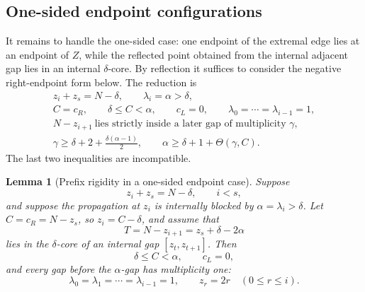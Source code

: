 \documentclass[11pt]{article}
\newtheorem{lemma}[theorem]{Lemma}
\begin{document}
\subsection{One-sided endpoint configurations}

It remains to handle the one-sided case: one endpoint of the extremal edge lies at an endpoint of $Z$, while the reflected point obtained from the internal adjacent gap lies in an internal $\delta$-core.  By reflection it suffices to consider the negative right-endpoint form below.  The reduction is
\[
\begin{gathered}
        z_i+z_s=N-\delta,
        \qquad
        \lambda_i=\alpha>\delta,\\
        C=c_R,
        \qquad
        \delta\le C<\alpha,
        \qquad
        c_L=0,
        \qquad
        \lambda_0=\cdots=\lambda_{i-1}=1,\\
        N-z_{i+1}\ \text{lies strictly inside a later gap of multiplicity }\gamma,\\
        \gamma\ge \delta+2+\frac{\delta(\alpha-1)}2,
        \qquad
        \alpha\ge \delta+1+\Theta(\gamma,C).
\end{gathered}
\]
The last two inequalities are incompatible.


\begin{lemma}[Prefix rigidity in a one-sided endpoint case]\label{lem:endpoint-blocked-initial}
Suppose
\[
        z_i+z_s=N-\delta,
        \qquad i<s,
\]
and suppose the propagation at $z_i$ is internally blocked by $\alpha=\lambda_i>\delta$.  Let $C=c_R=N-z_s$, so $z_i=C-\delta$, and assume that
\[
        T=N-z_{i+1}=z_s+\delta-2\alpha
\]
lies in the $\delta$-core of an internal gap $[z_t,z_{t+1}]$.  Then
\[
        \delta\le C<\alpha,
        \qquad
        c_L=0,
\]
and every gap before the $\alpha$-gap has multiplicity one:
\[
        \lambda_0=\lambda_1=\cdots=\lambda_{i-1}=1,
        \qquad
        z_r=2r\quad(0\le r\le i).
\]
\end{lemma}
\end{document}
